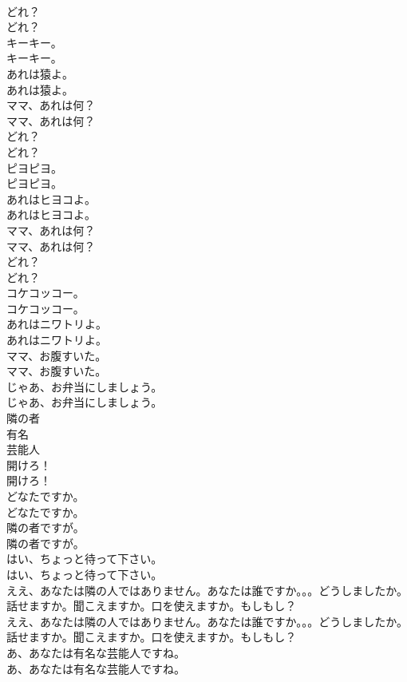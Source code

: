 \documentclass[8pt]{extreport}
\begin{document}
\begin{CJK}{UTF8}{min}
\\	どれ？	
\\	どれ？ 
\\	キーキー。	
\\	キーキー。 
\\	あれは猿よ。	
\\	あれは猿よ。 
\\	ママ、あれは何？	
\\	ママ、あれは何？ 
\\	どれ？	
\\	どれ？ 
\\	ピヨピヨ。	
\\	ピヨピヨ。 
\\	あれはヒヨコよ。	
\\	あれはヒヨコよ。 
\\	ママ、あれは何？	
\\	ママ、あれは何？ 
\\	どれ？	
\\	どれ？ 
\\	コケコッコー。	
\\	コケコッコー。 
\\	あれはニワトリよ。	
\\	あれはニワトリよ。 
\\	ママ、お腹すいた。	
\\	ママ、お腹すいた。 
\\	じゃあ、お弁当にしましょう。	
\\	じゃあ、お弁当にしましょう。 
\\	隣の者
\\	有名
\\	芸能人
\\	開けろ！	
\\	開けろ！ 
\\	どなたですか。	
\\	どなたですか。 
\\	隣の者ですが。	
\\	隣の者ですが。 
\\	はい、ちょっと待って下さい。	
\\	はい、ちょっと待って下さい。 
\\	ええ、あなたは隣の人ではありません。あなたは誰ですか。。。どうしましたか。話せますか。聞こえますか。口を使えますか。もしもし？	
\\	ええ、あなたは隣の人ではありません。あなたは誰ですか。。。どうしましたか。話せますか。聞こえますか。口を使えますか。もしもし？ 
\\	あ、あなたは有名な芸能人ですね。	
\\	あ、あなたは有名な芸能人ですね。 

\end{CJK}
\end{document}
